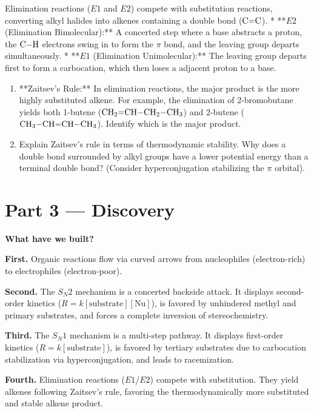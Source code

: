 \documentclass[12pt, a4paper]{book}
\begin{document}
\begin{explobox}
Elimination reactions ($E1$ and $E2$) compete with substitution reactions, converting alkyl halides into alkenes containing a double bond ($\ce{C=C}$).
* **$E2$ (Elimination Bimolecular):** A concerted step where a base abstracts a proton, the $\ce{C-H}$ electrons swing in to form the $\pi$ bond, and the leaving group departs simultaneously.
* **$E1$ (Elimination Unimolecular):** The leaving group departs first to form a carbocation, which then loses a adjacent proton to a base.

\begin{enumerate}[label=(\alph*), leftmargin=*]
  \item **Zaitsev's Rule:** In elimination reactions, the major product is the more highly substituted alkene.
        For example, the elimination of 2-bromobutane yields both 1-butene ($\ce{CH2=CH-CH2-CH3}$) and 2-butene ($\ce{CH3-CH=CH-CH3}$).
        Identify which is the major product.
  \item Explain Zaitsev's rule in terms of thermodynamic stability. Why does a double bond surrounded by alkyl groups have a lower potential energy than a terminal double bond? (Consider hyperconjugation stabilizing the $\pi$ orbital).
\end{enumerate}
\end{explobox}

\newpage

\section{Part 3 --- Discovery}

\begin{discoverybox}
\textbf{What have we built?}

\textbf{First.} Organic reactions flow via curved arrows from nucleophiles (electron-rich) to electrophiles (electron-poor).

\textbf{Second.} The $S_N2$ mechanism is a concerted backside attack. It displays second-order kinetics ($R = k[\text{substrate}][\text{Nu}]$), is favored by unhindered methyl and primary substrates, and forces a complete inversion of stereochemistry.

\textbf{Third.} The $S_N1$ mechanism is a multi-step pathway. It displays first-order kinetics ($R = k[\text{substrate}]$), is favored by tertiary substrates due to carbocation stabilization via hyperconjugation, and leads to racemization.

\textbf{Fourth.} Elimination reactions ($E1$/$E2$) compete with substitution. They yield alkenes following Zaitsev's rule, favoring the thermodynamically more substituted and stable alkene product.
\end{discoverybox}
\end{document}
